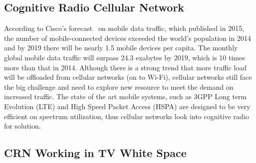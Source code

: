 \subsection{Cognitive Radio Cellular Network}
According to Cisco's forecast~\cite{Cisco_report_2015} on mobile data traffic, which published in 2015, the number of mobile-connected devices exceeded the world’s population in 2014 and by 2019 there will be nearly 1.5 mobile devices per capita.
The monthly global mobile data traffic will surpass 24.3 exabytes by 2019, which is 10 times more than that in 2014.
Although there is a strong trend that more traffic load will be offloaded from cellular networks (on to Wi-Fi), cellular networks still face the big challenge and need to explore new resource to meet the demand on increased traffic.
The state of the art mobile systems, such as 3GPP Long term Evolution (\gls{LTE}) and High Speed Packet Access (\gls{HSPA}) are designed to be very efficient on spectrum utilization, thus cellular networks look into cognitive radio for solution.


\subsection{CRN Working in TV White Space}
\label{TVWS}

